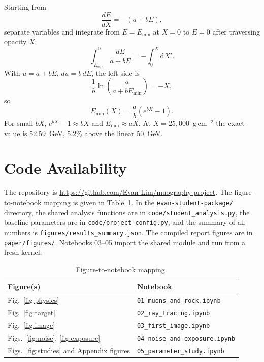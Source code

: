\documentclass{article}
\begin{document}
Starting from
\begin{equation}
\frac{dE}{dX}=-(a+bE),
\end{equation}
separate variables and integrate from $E=E_{\min}$ at $X=0$ to $E=0$
after traversing opacity $X$:
\begin{equation}
\int_{E_{\min}}^{0}\frac{dE}{a+bE}=-\int_{0}^{X}\mathrm{d}X\prime.
\end{equation}
With $u=a+bE$, $du=b\,dE$, the left side is
\begin{equation}
\frac{1}{b}\ln\left(\frac{a}{a+bE_{\min}}\right)=-X,
\end{equation}
so
\begin{equation}
E_{\min}(X)=\frac{a}{b}\left(e^{bX}-1\right).
\end{equation}
For small $bX$, $e^{bX}-1\approx bX$ and
$E_{\min}\approx aX$. At $X=25{,}000$~g\,cm$^{-2}$ the exact value
is 52.59~GeV, 5.2\% above the linear 50~GeV.

\section{Code Availability}
\label{app:code}

\begin{sloppypar}
The repository is
\url{https://github.com/Evan-Lim/muography-project}. The figure-to-notebook
mapping is given in Table~\ref{tab:code}. In the
\texttt{evan-student-package/} directory, the shared analysis functions are in
\texttt{code/student\_analysis.py}, the baseline parameters are in
\texttt{code/project\_config.py}, and the summary of all numbers is
\texttt{figures/results\_summary.json}. The compiled report figures are in
\texttt{paper/figures/}. Notebooks 03--05 import the shared
module and run from a fresh kernel.
\end{sloppypar}

\begin{table}[h]
\centering
\caption{Figure-to-notebook mapping.}
\label{tab:code}
\small
\begin{tabular}{@{}ll@{}}
\toprule
Figure(s) & Notebook \\
\midrule
Fig.~\ref{fig:physics} & \texttt{01\_muons\_and\_rock.ipynb} \\
Fig.~\ref{fig:target} & \texttt{02\_ray\_tracing.ipynb} \\
Fig.~\ref{fig:image} & \texttt{03\_first\_image.ipynb} \\
Figs.~\ref{fig:noise}, \ref{fig:exposure} & \texttt{04\_noise\_and\_exposure.ipynb} \\
Figs.~\ref{fig:studies} and Appendix figures & \texttt{05\_parameter\_study.ipynb} \\
\bottomrule
\end{tabular}
\end{table}
\end{document}

